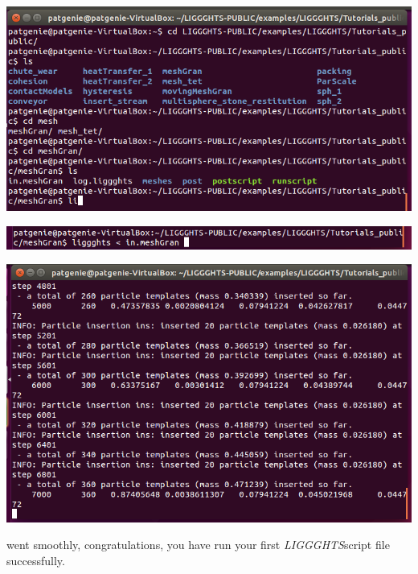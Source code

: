 \documentclass{tufte-book} %
\newcommand{\Li}{\textit{LIGGGHTS}}
\begin{document}
 \begin{marginfigure}
   \includegraphics[width=\linewidth]{graphics/Screenshot/Lig10.png}
   \caption{Type li into the shell prompt and hit}
 \end{marginfigure}
  \begin{marginfigure}
   \includegraphics[width=\linewidth]{graphics/Screenshot/Lig11.png}
   \caption{Type liggghts < in.meshGran}
 \end{marginfigure}
  \begin{marginfigure}
   \includegraphics[width=\linewidth]{graphics/Screenshot/Lig12.png}
   \caption{\Li should begin executing the file}
 \end{marginfigure}
  went smoothly, congratulations, you have run your first \Li script file successfully.
\end{document}
